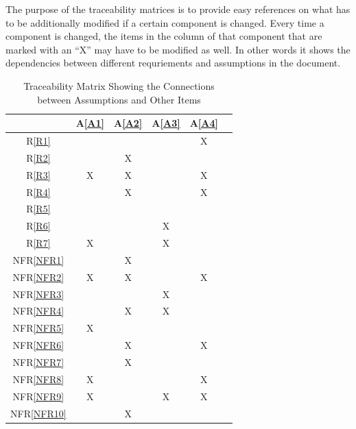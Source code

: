 \documentclass[12pt]{article}
\newcommand{\aref}[1]{A\ref{#1}}
\newcommand{\frref}[1]{R\ref{#1}}
\newcommand{\nfrref}[1]{NFR\ref{#1}}
\begin{document}
The purpose of the traceability matrices is to provide easy references on what
has to be additionally modified if a certain component is changed. Every time a
component is changed, the items in the column of that component that are marked
with an ``X'' may have to be modified as well. In other words it shows the dependencies 
between different requriements and assumptions in the document. 


\newpage
\noindent
\begin{landscape}
\begin{table}[h!]
	\centering
	\begin{tabular}{|c|c|c|c|c|c}
	\hline
		& \aref{A1}& \aref{A2}& \aref{A3}& \aref{A4} \\
	\hline          %
	\frref{R1}       &   &   &   & X  \\ \hline
	\frref{R2}       &   & X&   &    \\ \hline
	\frref{R3}       & X& X&   & X  \\ \hline
	\frref{R4}       &   & X&   & X  \\ \hline
	\frref{R5}       &   &   &   &    \\ \hline
	\frref{R6}       &   &   & X&    \\ \hline
	\frref{R7}       & X&   & X&     \\ \hline
	\nfrref{NFR1} &   & X&   &    \\ \hline
	\nfrref{NFR2} & X& X&   & X \\ \hline
	\nfrref{NFR3} &   &   & X&     \\ \hline
	\nfrref{NFR4} &   & X& X&     \\ \hline
	\nfrref{NFR5} &   X&   &   &      \\ \hline
	\nfrref{NFR6} &   &  X &   &X     \\ \hline
	\nfrref{NFR7} &   &  X &   &     \\ \hline
	\nfrref{NFR8} &  X &   &   &X     \\ \hline
	\nfrref{NFR9} & X  &   &X  &X      \\ \hline
	\nfrref{NFR10}&  & X  &   &      \\
	\hline
	\end{tabular}
	\caption{Traceability Matrix Showing the Connections between Assumptions and Other Items}
	\label{Table:A_trace}
\end{table}
\end{landscape}
\end{document}
